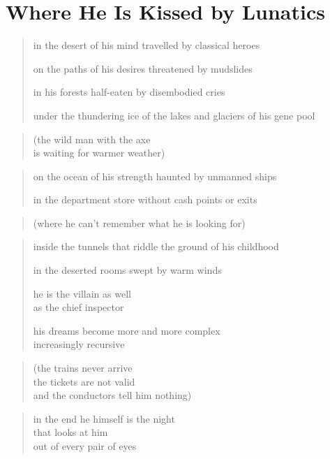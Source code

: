 {\setlength{\stanzaskip}{0.5em}

\section{Where He Is Kissed by Lunatics}

\begin{verse}
in the desert of his mind travelled by classical heroes

on the paths of his desires threatened by mudslides

in his forests half-eaten by disembodied cries

under the thundering ice of the lakes and glaciers of his gene pool
\end{verse}

\begin{quote}
(the wild man with the axe\\
is waiting for warmer weather)
\end{quote}

\begin{verse}
on the ocean of his strength haunted by unmanned ships

in the department store without cash points or exits
\end{verse}

\begin{quote}
(where he can't remember what he is looking for)
\end{quote}

\begin{verse}
inside the tunnels that riddle the ground of his childhood

in the deserted rooms swept by warm winds

he is the villain as well\\
as the chief inspector

his dreams become more and more complex\\
increasingly recursive
\end{verse}

\begin{quote}
(the trains never arrive\\
the tickets are not valid\\
and the conductors tell him nothing)
\end{quote}

\restoregeometry

\clearpage

\begin{verse}
in the end he himself is the night\\
that looks at him\\
out of every pair of eyes


\end{verse}}
